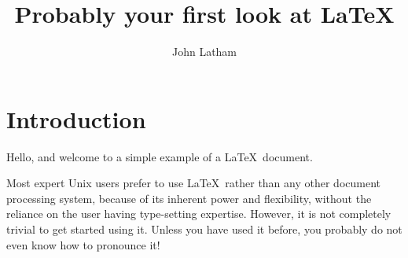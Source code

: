 \documentclass[12pt,a4paper]{article}
\title{Probably your first look at \LaTeX}
\author{John Latham}
\begin{document}

\maketitle


\tableofcontents




\section{Introduction}



Hello, and welcome to a simple example of a \LaTeX\ document.

Most expert Unix users prefer to use \LaTeX\ rather than any other document
processing system, because of its inherent power and flexibility, without the
reliance on the user having type-setting expertise. However, it is not
completely trivial to get started using it. Unless you have used it before,
you probably do not even know how to pronounce it!
\end{document}
